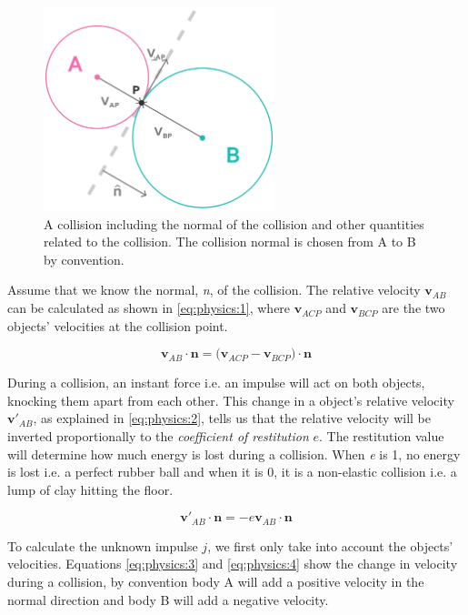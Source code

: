 \documentclass[a4paper,12pt]{report}
\begin{document}
\begin{figure}[!ht]
    \centering
    \includegraphics[width=0.6\textwidth]{figures/collision.png}
    \caption{A collision including the normal of the collision and other quantities related to the collision. The collision normal is chosen from A to B by convention.}
    \label{fig:collision}
\end{figure}

Assume that we know the normal, \emph{n}, of the collision. The relative velocity $\mathbf v_{AB}$ can be calculated as shown in \eqref{eq:physics:1}, where $\mathbf v_{ACP}$ and $\mathbf v_{BCP}$ are the two objects' velocities at the collision point.

\begin{equation}
\mathbf v_{AB}\cdot \mathbf n=\mathbf (\mathbf v_{ACP} - \mathbf v_{BCP})\cdot \mathbf n
\label{eq:physics:1}
\end{equation}

During a collision, an instant force i.e. an impulse will act on both objects, knocking them apart from each other. This change in a object’s relative velocity $\mathbf v'_{AB}$, as explained in \eqref{eq:physics:2}, tells us that the relative velocity will be inverted proportionally to the \emph{coefficient of restitution} $e$. The restitution value will determine how much energy is lost during a collision. When \emph{e} is 1, no energy is lost i.e. a perfect rubber ball and when it is 0, it is a non-elastic collision i.e. a lump of clay hitting the floor.

\begin{equation}
\mathbf v'_{AB}\cdot \mathbf n=-e\mathbf v_{AB}\cdot \mathbf n
\label{eq:physics:2}
\end{equation}

To calculate the unknown impulse $j$, we first only take into account the objects' velocities. Equations \eqref{eq:physics:3} and \eqref{eq:physics:4} show the change in velocity during a collision, by convention body A will add a positive velocity in the normal direction and body B will add a negative velocity.
\end{document}
